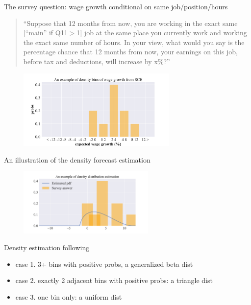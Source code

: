 \documentclass{beamer}
\begin{document}
\begin{frame}{The survey question: wage growth conditional on same job/position/hours}
	
	\begin{quote}
“Suppose that 12 months from now, you are working in the exact same [“main” if Q11$>$1] job at the same place you currently work and working the exact same number of hours. In your view, what would you say is the percentage chance that 12 months from now, your earnings on this job, before tax and deductions, will increase by x\%?”	
\end{quote}

	\begin{figure}
	\centering
	\label{fig: survey_question_illutration}
	\includegraphics[width=0.7\textwidth]{figures/density_bin_example.pdf}
\end{figure}
\end{frame}



\begin{frame}{An illustration of the density forecast estimation}
	\begin{figure}
		\centering
		\label{fig: dens_est_illutration}
		\includegraphics[width=0.6\textwidth]{figures/density_bin_est_example.pdf}
	\end{figure}
	
	Density estimation following \cite{engelberg_comparing_2009}	
	\begin{itemize}
		\item  case 1. 3+ bins with positive probs, a generalized beta dist
		\item case 2. exactly 2 adjacent bins with positive probs: a triangle dist 
		\item case 3. one bin only: a uniform dist
	\end{itemize}
	
\end{frame}
\end{document}
